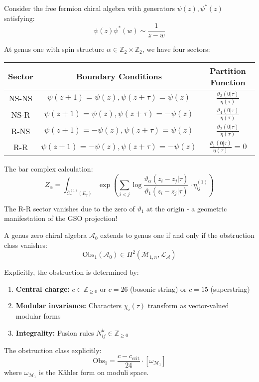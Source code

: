 \begin{example}
Consider the free fermion chiral algebra with generators $\psi(z), \psi^*(z)$ satisfying:
$$\psi(z)\psi^*(w) \sim \frac{1}{z-w}$$

At genus one with spin structure $\alpha \in \mathbb{Z}_2 \times \mathbb{Z}_2$, we have four sectors:

\begin{center}
\begin{tabular}{|c|c|c|}
\hline
Sector & Boundary Conditions & Partition Function \\
\hline
NS-NS & $\psi(z+1) = \psi(z), \psi(z+\tau) = \psi(z)$ & $\frac{\vartheta_3(0|\tau)}{\eta(\tau)}$ \\
NS-R & $\psi(z+1) = \psi(z), \psi(z+\tau) = -\psi(z)$ & $\frac{\vartheta_4(0|\tau)}{\eta(\tau)}$ \\
R-NS & $\psi(z+1) = -\psi(z), \psi(z+\tau) = \psi(z)$ & $\frac{\vartheta_2(0|\tau)}{\eta(\tau)}$ \\
R-R & $\psi(z+1) = -\psi(z), \psi(z+\tau) = -\psi(z)$ & $\frac{\vartheta_1(0|\tau)}{\eta(\tau)} = 0$ \\
\hline
\end{tabular}
\end{center}

The bar complex calculation:
$$Z_\alpha = \int_{\overline{C}_*^{(1)}(E_\tau)} \exp\left(\sum_{i<j} \log\frac{\vartheta_\alpha(z_i - z_j|\tau)}{\vartheta_1(z_i - z_j|\tau)} \cdot \eta_{ij}^{(1)}\right)$$

The R-R sector vanishes due to the zero of $\vartheta_1$ at the origin - a geometric manifestation of the GSO projection!
\end{example}

\begin{theorem}\label{thm:extension-obstruction}
A genus zero chiral algebra $\mathcal{A}_0$ extends to genus one if and only if the obstruction class vanishes:
$$\text{Obs}_1(\mathcal{A}_0) \in H^2(\overline{\mathcal{M}}_{1,n}, \mathcal{L}_\mathcal{A})$$

Explicitly, the obstruction is determined by:
\begin{enumerate}
\item \textbf{Central charge:} $c \in \mathbb{Z}_{\geq 0}$ or $c = 26$ (bosonic string) or $c = 15$ (superstring)
\item \textbf{Modular invariance:} Characters $\chi_i(\tau)$ transform as vector-valued modular forms
\item \textbf{Integrality:} Fusion rules $N_{ij}^k \in \mathbb{Z}_{\geq 0}$
\end{enumerate}

The obstruction class explicitly:
$$\text{Obs}_1 = \frac{c - c_{\text{crit}}}{24} \cdot [\omega_{\mathcal{M}_1}]$$
where $\omega_{\mathcal{M}_1}$ is the Kähler form on moduli space.
\end{theorem}


